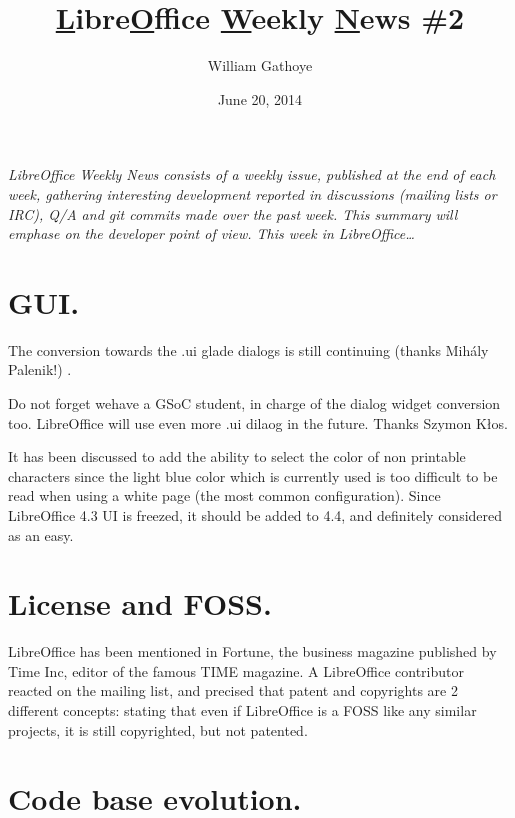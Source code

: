 \documentclass{article}
\begin{document}
\title{\underline{L}ibre\underline{O}ffice \underline{W}eekly \underline{N}ews \#2}
\author{William Gathoye}
\date{June 20, 2014}
\maketitle



\emph{LibreOffice Weekly News consists of a weekly issue, published at the end of
each week, gathering interesting development reported in discussions (mailing
lists or IRC), Q/A and git commits made over the past week. This summary will
emphase on the developer point of view.
This week in LibreOffice\ldots}



\section{GUI.}

The conversion towards the .ui glade dialogs is still continuing (thanks Mihály Palenik!) \cite{gladeUi1,gladeUi2,gladeUi3}.

Do not forget wehave a GSoC student, in charge of the dialog widget conversion too\cite{gsocDialogConversion}. LibreOffice will use even more .ui dilaog in the future. Thanks Szymon Kłos.


It has been discussed to add the ability to select the color of non printable characters since the light blue color which is currently used is too difficult to be read when using a white page (the most common configuration)\cite{lightBlueCharacter}. Since LibreOffice 4.3 UI is freezed, it should be added to 4.4, and definitely considered as an easy\cite{lightBlueCharacterEasyHackProposal}.

\section{License and FOSS.}

LibreOffice has been mentioned in Fortune\cite{fortuneTime}, the business magazine published by Time Inc, editor of the famous TIME magazine. A LibreOffice contributor reacted on the mailing list\cite{fortuneTimeReaction}, and precised that patent and copyrights are 2 different concepts: stating that even if LibreOffice is a FOSS like any similar projects, it is still copyrighted, but not patented. 


\section{Code base evolution.}
\end{document}

